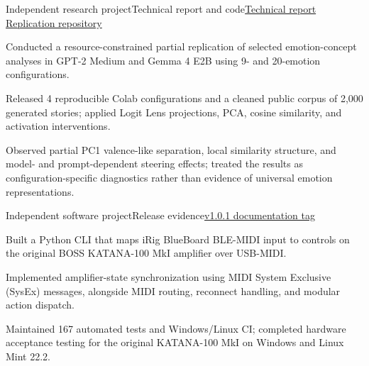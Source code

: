 \documentclass[10pt,letterpaper]{article}
\begin{document}
\newpage
\ResumePageContinuation

  {Independent research project}{Technical report and code}{\href{https://raw.githubusercontent.com/NotsoJharedtrollOx17/EmotionVectorExtraction-Gemma4-GPT2/54e896b5f9b0154c1b5a1c1272b058889894a31e/PartialReplicationEmotionVectors.pdf}{Technical report} \SkillSep \href{https://github.com/NotsoJharedtrollOx17/EmotionVectorExtraction-Gemma4-GPT2}{Replication repository}}
\begin{cvitems}
  \item Conducted a resource-constrained partial replication of selected emotion-concept analyses in GPT-2 Medium and Gemma 4 E2B using 9- and 20-emotion configurations.
  \item Released 4 reproducible Colab configurations and a cleaned public corpus of 2,000 generated stories; applied Logit Lens projections, PCA, cosine similarity, and activation interventions.
  \item Observed partial PC1 valence-like separation, local similarity structure, and model- and prompt-dependent steering effects; treated the results as configuration-specific diagnostics rather than evidence of universal emotion representations.
\end{cvitems}

  {Independent software project}{Release evidence}{\href{https://github.com/NotsoJharedtrollOx17/BlueBoard-BOSSKatana-Pedalboard/tree/v1.0.1}{v1.0.1 documentation tag}}
\begin{cvitems}
  \item Built a Python CLI that maps iRig BlueBoard BLE-MIDI input to controls on the original BOSS KATANA-100 MkI amplifier over USB-MIDI.
  \item Implemented amplifier-state synchronization using MIDI System Exclusive (SysEx) messages, alongside MIDI routing, reconnect handling, and modular action dispatch.
  \item Maintained 167 automated tests and Windows/Linux CI; completed hardware acceptance testing for the original KATANA-100 MkI on Windows and Linux Mint 22.2.
\end{cvitems}
\end{document}
